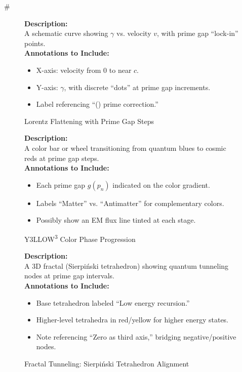 #  \documentclass[11pt]{article}
\begin{document}
\begin{figure}[p]
\caption{Lorentz Flattening with Prime Gap Steps}
\label{fig:lorentzFlattening}
\textbf{Description:}\\
A schematic curve showing \(\gamma\) vs. velocity \(v\), with prime gap “lock-in” points.\\[0.5em]
\textbf{Annotations to Include:}
\begin{itemize}
    \item X-axis: velocity from 0 to near $c$.
    \item Y-axis: $\gamma$, with discrete “dots” at prime gap increments.
    \item Label referencing “(\oplus) prime correction.”
\end{itemize}
\end{figure}

\begin{figure}[p]
\caption{Y3LLOW\textsuperscript{3} Color Phase Progression}
\label{fig:colorPhases}
\textbf{Description:}\\
A color bar or wheel transitioning from quantum blues to cosmic reds at prime gap steps.\\[0.5em]
\textbf{Annotations to Include:}
\begin{itemize}
    \item Each prime gap $g(p_n)$ indicated on the color gradient.
    \item Labels “Matter” vs. “Antimatter” for complementary colors.
    \item Possibly show an EM flux line tinted at each stage.
\end{itemize}
\end{figure}

\begin{figure}[p]
\caption{Fractal Tunneling: Sierpi\'nski Tetrahedron Alignment}
\label{fig:fractalTunneling}
\textbf{Description:}\\
A 3D fractal (Sierpi\'nski tetrahedron) showing quantum tunneling nodes at prime gap intervals.\\[0.5em]
\textbf{Annotations to Include:}
\begin{itemize}
    \item Base tetrahedron labeled “Low energy recursion.”
    \item Higher-level tetrahedra in red/yellow for higher energy states.
    \item Note referencing “Zero as third axis,” bridging negative/positive nodes.
\end{itemize}
\end{figure}

\clearpage



\end{document}
